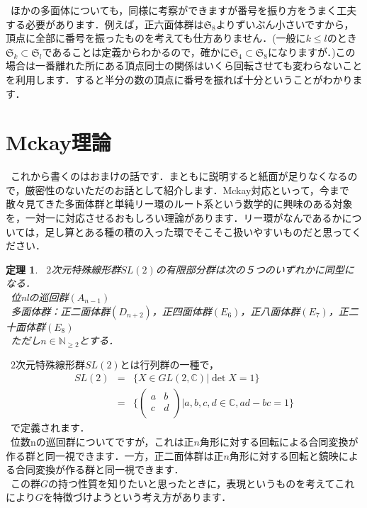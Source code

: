 \documentclass[./main]{subfiles}
\theoremstyle{idefinition}
\newtheorem{ithm}[idefi]{定理}
\begin{document}
\ ほかの多面体についても，同様に考察ができますが番号を振り方をうまく工夫する必要があります．例えば，正六面体群は$\mathfrak{S}_8$よりずいぶん小さいですから，頂点に全部に番号を振ったものを考えても仕方ありません．(一般に$k\leq l$のとき$\mathfrak{S}_k \subset \mathfrak{S}_l$であることは定義からわかるので，確かに$\mathfrak{S}_4 \subset \mathfrak{S}_8$になりますが．)この場合は一番離れた所にある頂点同士の関係はいくら回転させても変わらないことを利用します．すると半分の数の頂点に番号を振れば十分ということがわかります．\\

\section{Mckay理論}
\ これから書くのはおまけの話です．まともに説明すると紙面が足りなくなるので，厳密性のないただのお話として紹介します．Mckay対応といって，今まで散々見てきた多面体群と単純リー環のルート系という数学的に興味のある対象を，一対一に対応させるおもしろい理論があります．リー環がなんであるかについては，足し算とある種の積の入った環でそこそこ扱いやすいものだと思ってください．\\
\begin{ithm}
\ $2$次元特殊線形群$SL(2)$の有限部分群は次の５つのいずれかに同型になる．\\
\ 位nlの巡回群$(A_{n-1})$\\
\ 多面体群：正二面体群$(D_{n+2})$，正四面体群$(E_6)$，正八面体群$(E_7)$，正二十面体群$(E_8)$\\
\ ただし$n \in\mathbb{N}_{ \geq 2}$とする．
\end{ithm}
\ $2$次元特殊線形群$SL(2)$とは行列群の一種で，
\begin{eqnarray*}
SL(2)&=&\{X\in GL(2,\mathbb{C}) | \det X=1\}\\
&=&\{
\begin{pmatrix} 
a&b\\ 
c&d\\ 
\end{pmatrix}
| a,b,c,d \in \mathbb{C} ,ad-bc=1\}
\end{eqnarray*}
\ で定義されます．\\
\ 位数nの巡回群についてですが，これは正$n$角形に対する回転による合同変換が作る群と同一視できます．一方，正二面体群は正$n$角形に対する回転と鏡映による合同変換が作る群と同一視できます．\\
\ この群$G$の持つ性質を知りたいと思ったときに，表現というものを考えてこれにより$G$を特徴づけようという考え方があります．\\
\end{document}
